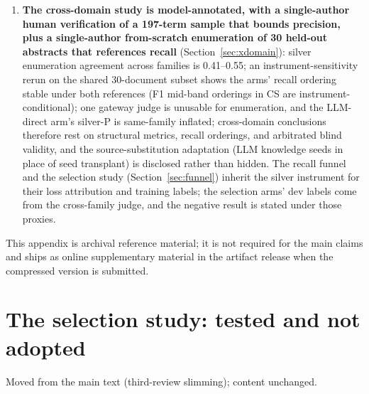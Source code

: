 \documentclass[preprint,12pt]{elsarticle}
\begin{document}
\begin{enumerate}
model--human agreement 0.64--0.80, model levels optimistic by
${\sim}$0.2--0.3, and inter-pass $\kappa$=0.545 on production links
(vs.\ 0.915 cross-domain)---per-link validity on generic-word links is
intrinsically contested even between human passes. The verdicts-only
record ships with the artifact.
\item \textbf{The cross-domain study is model-annotated, with a
single-author human verification of a 197-term sample that bounds
precision, plus a single-author from-scratch enumeration of 30
held-out abstracts that references recall}
(Section~\ref{sec:xdomain}): silver enumeration agreement across
families is 0.41--0.55; an instrument-sensitivity rerun on the shared
30-document subset shows the arms' recall ordering stable under both
references (F1 mid-band orderings in CS are instrument-conditional);
one gateway judge is
unusable for enumeration, and the LLM-direct arm's silver-P is
same-family inflated; cross-domain conclusions therefore rest on
structural metrics, recall orderings, and arbitrated blind validity,
and the
source-substitution adaptation (LLM knowledge seeds in place of seed
transplant) is disclosed rather than hidden. The recall funnel and the
selection study (Section~\ref{sec:funnel}) inherit the silver
instrument for their loss attribution and training labels; the
selection arms' dev labels come from the cross-family judge, and the
negative result is stated under those proxies.
\end{enumerate}


\appendix

\noindent This appendix is archival reference material; it is not
required for the main claims and ships as online supplementary
material in the artifact release when the compressed version is
submitted.

\section{The selection study: tested and not adopted}
\label{app:selection}

Moved from the main text (third-review slimming); content unchanged.
\end{document}
